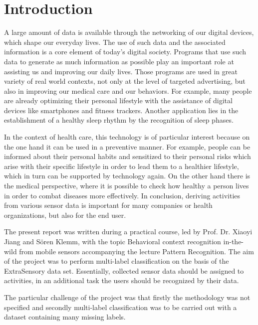 \section{Introduction}
A large amount of data is available through the networking of our digital devices, which shape our everyday lives. The use of such data and the associated information is a core element of today's digital society. Programs that use such data to generate as much information as possible play an important role at assisting us and improving our daily lives. Those programs are used in great variety of real world contexts, not only at the level of targeted advertising, but also in improving our medical care and our behaviors. For example, many people are already optimizing their personal lifestyle with the assistance of digital devices like smartphones and fitness trackers. Another application lies in the establishment of a healthy sleep rhythm by the recognition of sleep phases. 

In the context of health care, this technology is of particular interest because on the one hand it can be used in a preventive manner. For example, people can be informed about their personal habits and sensitized to their personal risks which arise with their specific lifestyle in order to lead them to a healthier lifestyle, which in turn can be supported by technology again. On the other hand there is the medical perspective, where it is possible to check how healthy a person lives in order to combat diseases more effectively. In conclusion, deriving activities from various sensor data is important for many companies or health organizations, but also for the end user.

The present report was written during a practical course, led by Prof. Dr. Xiaoyi Jiang and Sören Klemm, with the topic \gl Behavioral context recognition in-the-wild from mobile sensors\gr{} accompanying the lecture Pattern Recognition. The aim of the project was to perform multi-label classification on the basis of the ExtraSensory data set. Essentially, collected sensor data should be assigned to activities, in an additional task the users should be recognized by their data. 

The particular challenge of the project was that firstly the methodology was not specified and secondly multi-label classification was to be carried out with a dataset containing many missing labels. 